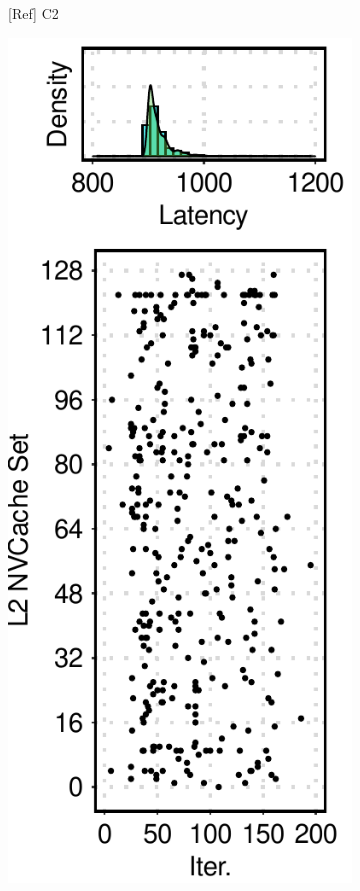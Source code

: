 \begin{figure}[t]
\begin{subfigure}[b]{.12\textwidth}
        \caption{[Ref] C2}
        \label{fig:12:ref:side-channel-feature-c2}
    \end{subfigure}
    \hfill
    \begin{subfigure}[b]{.12\textwidth}
        \centering
        \includegraphics[width=\linewidth]{figure/plot/reference/fig12-side-sql-c3.pdf}

\end{subfigure}
\end{figure}
